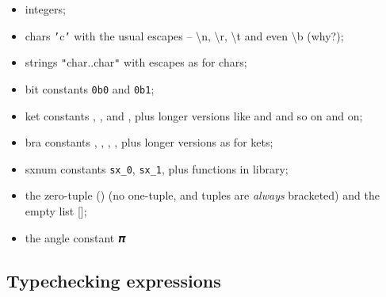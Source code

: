 \documentclass[11pt,a4paper]{book}
\newcommand{\verbtt}[1]{\texttt{\small{}#1}}
\begin{document}
\begin{itemize}
\item integers;
\item chars \verbtt{'}c\verbtt{'} with the usual escapes -- \textbackslash{n}, \textbackslash{r}, \textbackslash{t} and even \textbackslash{b} (why?);
\item strings \verbtt{"}char..char\verbtt{"} with escapes as for chars;
\item bit constants \verbtt{0b0} and \verbtt{0b1};
\item ket constants \zero, \one, \plus{} and \minus, plus longer versions like  and \bv{+-+} and so on and on;
\item bra constants , , \vb{+}, \vb{-}, plus longer versions as for kets; 
\item sxnum constants \verbtt{sx\_0}, \verbtt{sx\_1}, plus functions in library;
\item the zero-tuple () (no one-tuple, and tuples are \emph{always} bracketed) and the empty list [];
\item the angle constant 𝝅
\end{itemize}

\subsection{Typechecking expressions}
\end{document}
